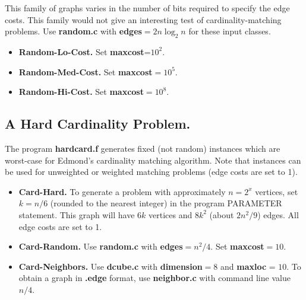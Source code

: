 This family of graphs varies in the number of bits required to specify
the edge costs.  This family would not give an interesting test of
cardinality-matching problems.  Use {\bf random.c} with {\bf edges}$=2
n \log_2 n$ for these input classes.

\begin{itemize}
\item {\bf Random-Lo-Cost.} Set {\bf maxcost}=$10^2$. 

\item {\bf Random-Med-Cost.} Set {\bf maxcost}$=10^5$. 

\item {\bf Random-Hi-Cost.} Set {\bf maxcost}$=10^8$. 

\end{itemize} 

\subsection{A Hard Cardinality Problem.} 

The program {\bf hardcard.f} generates fixed (not random) instances
which are worst-case for Edmond's cardinality matching algorithm.
Note that instances can be used for unweighted or 
weighted matching problems (edge costs are set to 1).  

\begin{itemize}

\item {\bf Card-Hard.}  To generate a problem with approximately 
$n=2^x$ vertices, set $k = n/6$ (rounded to the nearest integer)
in the program PARAMETER statement.  This graph will have $6k$
vertices and $8k^2$ (about $2n^2 / 9$) edges.  All edge costs are set to 1.

\item {\bf Card-Random.} Use {\bf random.c} with {\bf edges}$=n^2/4$. 
Set {\bf maxcost}$=10$. 

\item {\bf Card-Neighbors.}  Use {\bf dcube.c} with {\bf dimension}$=8$
and {\bf maxloc} = $10$.  To obtain a graph in {\bf .edge} format,
use {\bf neighbor.c } with command line value $n/4$.  

\end{itemize} 



